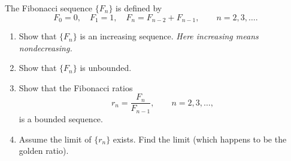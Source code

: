 \begingroup
\renewcommand{\labelenumi}{(\alph{enumi})}
\begin{exercise}
  \label{ex:hw03:fibonacci-ratios}
  The Fibonacci sequence $\{F_n\}$ is defined by
  \[
    F_0=0,\quad F_1=1,\quad F_n=F_{n-2}+F_{n-1},
    \qquad n=2,3,\ldots.
  \]
  \begin{enumerate}
    \item Show that $\{F_n\}$ is an increasing sequence.
      \emph{Here increasing means nondecreasing.}
    \item Show that $\{F_n\}$ is unbounded.
    \item Show that the Fibonacci ratios
      \[
        r_n=\frac{F_n}{F_{n-1}},\qquad n=2,3,\ldots,
      \]
      is a bounded sequence.
    \item Assume the limit of $\{r_n\}$ exists. Find the limit
      (which happens to be the golden ratio).
  \end{enumerate}
\end{exercise}
\endgroup
